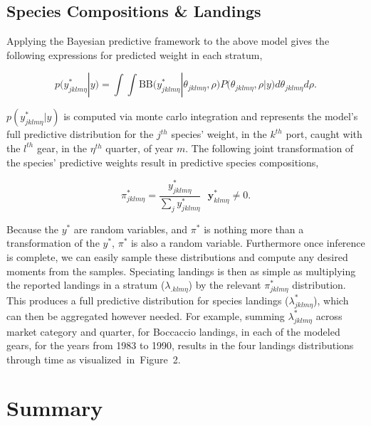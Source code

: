 \documentclass[12pt]{article}
\begin{document}
%
%

%
\subsection{Species Compositions \& Landings}

%
Applying the Bayesian predictive framework to the above model gives the
following expressions for predicted weight in each stratum,

%
\[p(y^*_{jklm\eta}|y) = \int\!\!\!\!\int\! \text{BB}\Big( y^*_{jklm\eta}|\theta_{jklm\eta}, \rho \Big) P\Big(\theta_{jklm\eta}, \rho | y\Big) d\theta_{jklm\eta} d\rho.\]

%
\(p(y^*_{jklm\eta}|y)\) is computed via monte carlo integration and
represents the model's full predictive distribution for the \(j^{th}\)
species' weight, in the \(k^{th}\) port, caught with the \(l^{th}\)
gear, in the \(\eta^{th}\) quarter, of year \(m\). The following joint
transformation of the species' predictive weights result in predictive
species compositions,

%
\[\pi^*_{jklm\eta} = \frac{y^*_{jklm\eta}}{\sum_j y^*_{jklm\eta}} ~~~ \bm{y}^*_{klm\eta}\neq 0.\]

%
Because the \(y^*\) are random variables, and \(\pi^*\) is nothing more
than a transformation of the \(y^*\), \(\pi^*\) is also a random
variable. Furthermore once inference is complete, we can easily sample
these distributions and compute any desired moments from the samples. 
Speciating landings is then as simple as multiplying the reported landings 
in a stratum ($\lambda_{.klm\eta}$) by the relevant \(\pi^*_{jklm\eta}\) 
distribution. This produces a full predictive distribution for species landings 
($\lambda^*_{jklm\eta}$), which can then be aggregated however needed. For example, 
summing $\lambda^*_{jklm\eta}$ across market category and quarter, for 
Boccaccio landings, in each of the modeled gears, for the years from 1983 to 
1990, results in the four landings distributions through time as 
\mbox{visualized in Figure 2.} 



%
\section{Summary}
\end{document}
